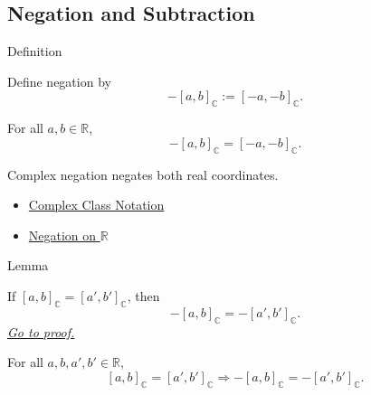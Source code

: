 \subsection*{Negation and Subtraction}

\begin{definitionbox}{Definition}
\begin{definition}
\label{def:negation-on-c-classes}
Define negation by
\[
-[a,b]_{\mathbb{C}}:=[-a,-b]_{\mathbb{C}}.
\]
\end{definition}
\end{definitionbox}


\begin{remark*}
For all $a,b\in\mathbb{R}$,
\[
-[a,b]_{\mathbb{C}}=[-a,-b]_{\mathbb{C}}.
\]
\end{remark*}

\begin{remark*}[Interpretation]
Complex negation negates both real coordinates.
\end{remark*}

\begin{dependencies}
\begin{itemize}
  \item \hyperref[def:complex-class-notation]{Complex Class Notation}
  \item \hyperref[def:negation-on-r]{Negation on $\mathbb{R}$}
\end{itemize}
\end{dependencies}

\begin{lemmabox}{Lemma}
\begin{lemma}
\label{lem:negation-on-c-respects-equivalence}
If $[a,b]_{\mathbb{C}}=[a',b']_{\mathbb{C}}$, then
\[
-[a,b]_{\mathbb{C}}=-[a',b']_{\mathbb{C}}.
\]
\hyperref[prf:negation-on-c-respects-equivalence]{\textit{Go to proof.}}
\end{lemma}
\end{lemmabox}

\begin{remark*}
For all $a,b,a',b'\in\mathbb{R}$,
\[
[a,b]_{\mathbb{C}}=[a',b']_{\mathbb{C}}
\Longrightarrow
-[a,b]_{\mathbb{C}}=-[a',b']_{\mathbb{C}}.
\]
\end{remark*}

